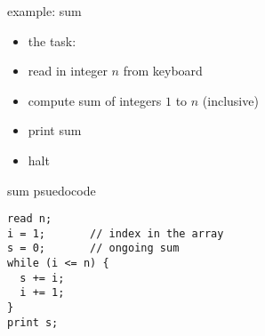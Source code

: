 \begin{frame}{example: sum}
\begin{itemize}
\item the task:
\vspace{1cm}
\item read in integer $n$ from keyboard
\item compute sum of integers $1$ to $n$ (inclusive)
\item print sum
\item halt
\end{itemize}
\end{frame}

\begin{frame}[fragile,label=sumPsuedo]{sum psuedocode}
\begin{lstlisting}
read n;
i = 1;       // index in the array
s = 0;       // ongoing sum
while (i <= n) {
  s += i;
  i += 1;
}
print s;
\end{lstlisting}
\end{frame}

